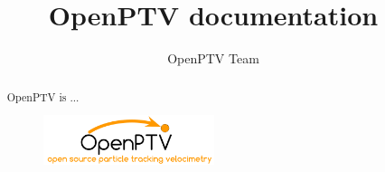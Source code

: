 \documentclass[12pt,a4paper]{report}
\begin{document}
\author{OpenPTV Team}
\title{OpenPTV documentation}
\pagestyle{empty}
\maketitle
\thispagestyle{empty}

\pagestyle{fancy}

\begin{abstract}
OpenPTV is ...

\begin{figure}[!ht]
\includegraphics[width=5cm]{./img/OpenPTV_logo.png}
\end{figure}
\end{abstract}

\tableofcontents
\listoffigures
\newpage







\appendix

\end{document}
